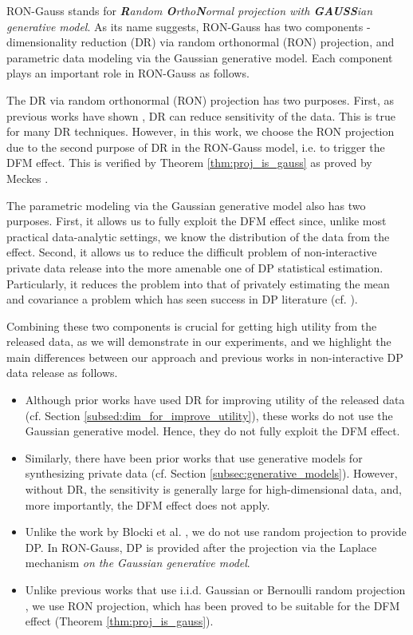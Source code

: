 \documentclass[USenglish,oneside,twocolumn]{article}
\theoremstyle{definition}
\theoremstyle{remark}
\theoremstyle{plain}
\theoremstyle{plain}
\begin{document}
RON-Gauss stands for \emph{\textbf{R}andom \textbf{O}rtho\textbf{N}ormal projection with \textbf{GAUSS}ian
generative model}. As its name suggests, RON-Gauss has two components
- dimensionality reduction (DR) via random orthonormal (RON) projection,
and parametric data modeling via the Gaussian generative model. Each
component plays an important role in RON-Gauss as follows.

The DR via random orthonormal (RON) projection has two purposes. First,
as previous works have shown \cite{RefWorks:313,RefWorks:314,RefWorks:337,RefWorks:338,RefWorks:339,RefWorks:224},
DR can reduce sensitivity of the data. This is true for many DR techniques.
However, in this work, we choose the RON projection due to the second purpose of DR
in the RON-Gauss model, i.e. to trigger the DFM effect. This is verified by Theorem \ref{thm:proj_is_gauss} as proved by Meckes \cite{RefWorks:439}.

The parametric modeling via the Gaussian generative model also has
two purposes. First, it allows us to fully exploit the DFM effect
since, unlike most practical data-analytic settings, we know the distribution
of the data from the effect. Second, it allows us to reduce the
difficult problem of non-interactive private data release into the
more amenable one of DP statistical estimation. Particularly, it reduces
the problem into that of privately estimating the mean and covariance
\textendash{} a problem which has seen success in DP literature (cf.
\cite{RefWorks:477,RefWorks:478,RefWorks:479,RefWorks:185,RefWorks:194,RefWorks:195,RefWorks:249,RefWorks:220}).

Combining these two components is crucial for getting high utility
from the released data, as we will demonstrate in our experiments, and we highlight the main differences between our approach and
previous works in non-interactive DP data release as follows.
\begin{itemize}
\item Although prior works have used DR for improving
utility of the released data (cf. Section \ref{subsed:dim_for_improve_utility}),
these works do not use the Gaussian generative model. Hence, they do not
fully exploit the DFM effect. 
\item Similarly, there have been prior works that use generative models for synthesizing
private data (cf. Section \ref{subsec:generative_models}). However,
without DR, the sensitivity is generally large for high-dimensional
data, and, more importantly, the DFM effect does not apply.
\item Unlike the work by Blocki et al.
\cite{RefWorks:313}, we do not use random projection to provide DP.
In RON-Gauss, DP is provided after the projection via the Laplace
mechanism \emph{on the Gaussian generative model}. 
\item Unlike previous
works that use i.i.d. Gaussian or Bernoulli random projection \cite{RefWorks:314,RefWorks:338,RefWorks:400,RefWorks:337},
we use RON projection, which has been proved to be suitable
for the DFM effect (Theorem \ref{thm:proj_is_gauss}).
\end{itemize}
\end{document}
